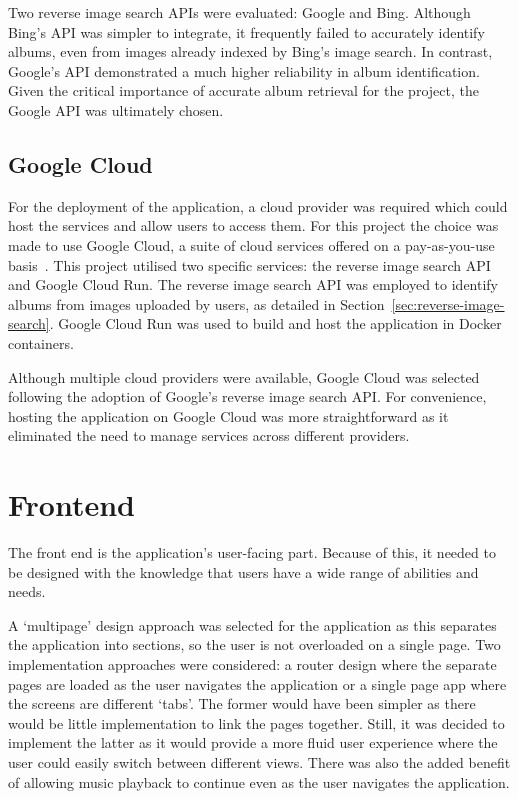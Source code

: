 Two reverse image search APIs were evaluated: Google and Bing. Although Bing's API was simpler to integrate, it frequently failed to accurately identify albums, even from images already indexed by Bing's image search. In contrast, Google's API demonstrated a much higher reliability in album identification. Given the critical importance of accurate album retrieval for the project, the Google API was ultimately chosen.

\subsection{Google Cloud}
For the deployment of the application, a cloud provider was required which could host the services and allow users to access them. For this project the choice was made to use Google Cloud, a suite of cloud services offered on a pay-as-you-use basis~\cite{GCP}. This project utilised two specific services: the reverse image search API and Google Cloud Run. The reverse image search API was employed to identify albums from images uploaded by users, as detailed in Section~\ref{sec:reverse-image-search}. Google Cloud Run was used to build and host the application in Docker containers.

Although multiple cloud providers were available, Google Cloud was selected following the adoption of Google's reverse image search API. For convenience, hosting the application on Google Cloud was more straightforward as it eliminated the need to manage services across different providers.

\section{Frontend}
The front end is the application's user-facing part. Because of this, it needed to be designed with the knowledge that users have a wide range of abilities and needs.

A `multipage' design approach was selected for the application as this separates the application into sections, so the user is not overloaded on a single page. Two implementation approaches were considered: a router design where the separate pages are loaded as the user navigates the application or a single page app where the screens are different `tabs'. The former would have been simpler as there would be little implementation to link the pages together. Still, it was decided to implement the latter as it would provide a more fluid user experience where the user could easily switch between different views. There was also the added benefit of allowing music playback to continue even as the user navigates the application.

